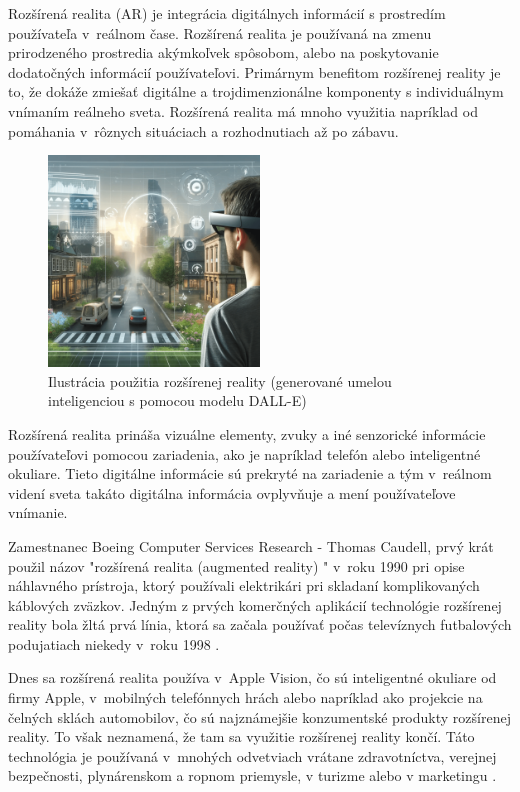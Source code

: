 Rozšírená realita (AR) je integrácia digitálnych informácií s  prostredím používateľa v~reálnom čase. Rozšírená realita je používaná na zmenu prirodzeného prostredia akýmkoľvek spôsobom, alebo na poskytovanie dodatočných informácií používateľovi. Primárnym benefitom rozšírenej reality je to, že dokáže zmiešať digitálne a trojdimenzionálne komponenty s individuálnym vnímaním reálneho sveta. Rozšírená realita má mnoho využitia napríklad od pomáhania v~rôznych situáciach a rozhodnutiach až po zábavu.

\begin{figure}[h]
  \centering
  \includegraphics[width=0.5\textwidth]{img/rozsirena_realita.png}
  \caption{Ilustrácia použitia rozšírenej reality (generované umelou inteligenciou s pomocou modelu DALL-E)}
  \label{fig:roz_real}
\end{figure}

Rozšírená realita prináša vizuálne elementy, zvuky a iné senzorické informácie používateľovi pomocou zariadenia, ako je napríklad telefón alebo inteligentné okuliare. Tieto digitálne informácie sú prekryté na zariadenie a tým v~reálnom videní sveta takáto digitálna informácia ovplyvňuje a mení používateľove vnímanie. 

Zamestnanec Boeing Computer Services Research - Thomas Caudell, prvý krát použil názov "rozšírená realita (augmented reality) " v~roku 1990 pri opise náhlavného prístroja, ktorý používali elektrikári pri skladaní komplikovaných káblových zväzkov. Jedným z prvých komerčných aplikácií technológie rozšírenej reality bola žltá prvá línia, ktorá sa začala používať počas televíznych futbalových podujatiach niekedy v~roku 1998 \cite{gillis2024ar}. 

Dnes sa rozšírená realita používa v~Apple Vision, čo sú inteligentné okuliare od firmy Apple, v~mobilných telefónnych hrách alebo napríklad ako projekcie na čelných sklách automobilov, čo sú najznámejšie konzumentské produkty rozšírenej reality. To však neznamená, že tam sa využitie rozšírenej reality končí. Táto technológia je používaná v~mnohých odvetviach vrátane zdravotníctva, verejnej bezpečnosti, plynárenskom a ropnom priemysle, v turizme alebo v marketingu \cite{gillis2024ar}. %

